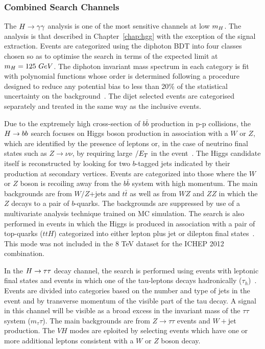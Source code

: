 \subsubsection{Combined Search Channels}
The $H\rightarrow\gamma\gamma$ analysis is one of the most sensitive channels at low $m_{H}$. The 
analysis is that described in Chapter~\ref{chap:hgg} with the exception of
the signal extraction. Events are categorized using the diphoton BDT into 
four classes chosen so as to optimise the search in terms of the expected limit
at $m_{H}=125~GeV$. The diphoton invariant mass spectrum in each category is fit 
with polynomial functions whose order is determined following a procedure designed
to reduce any potential bias to less than 20\% of the statistical uncertainty on 
the background~\cite{HIG-12-15}. The dijet selected events are 
categorised separately and treated in the same way as the inclusive events.

Due to the exptremely high cross-section of $b\bar{b}$ production in 
p-p collisions, the $H\rightarrow bb$ search focuses on Higgs boson production in association
with a $W$ or $Z$, which are identified by the presence of leptons or, in the case 
of neutrino final states such as $Z\rightarrow \nu\nu$, by requiring large $\slash{E_{T}}$ 
in the event~\cite{HIG-12-019}. The Higgs candidate itself is reconstructed by looking for two 
$b$-tagged jets indicated by their production at secondary vertices. Events are 
categorized into those where the 
$W$ or $Z$ boson is recoiling away from the $b\bar{b}$ system with high momentum.
The main backgrounds are from $W/Z$+jets and $t\bar{t}$ as well as from $WZ$ and $ZZ$
in which the $Z$ decays to a pair of $b$-quarks. The backgrounds are suppressed
by use of a multivariate analysis technique trained on MC simulation.
The search is also performed in events in which the Higgs is produced in association
with a pair of top-quarks ($ttH$) categorized into either lepton plus jet or dilepton 
final states~\cite{HIG-12-019}. This mode was not included in the 8 TeV dataset
for the ICHEP 2012 combination.

In the $H\rightarrow\tau\tau$ decay channel, the search is performed using events with leptonic
final states and events in which one of the tau-leptons decays hadronically 
($\tau_{h}$)~\cite{HIG-12-018}.
Events are divided into categories based on the number and type of jets in the event
and by transverse momentum of the visible part of the tau decay.
A signal in this channel will be visible as a broad excess in the invariant mass
of the $\tau\tau$ system ($m_\tau\tau$). The main backgrounds are from
$Z\rightarrow\tau\tau$ events and $W+$jet production. The $VH$ modes are
eploited by selecting events which have one or more additional leptons 
consistent with a $W$ or $Z$ boson decay.

